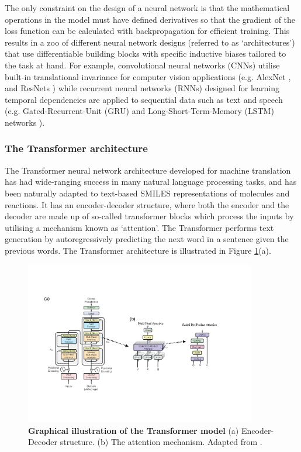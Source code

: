 The only constraint on the design of a neural network is that the mathematical operations in the model must have defined derivatives so that the gradient of the loss function can be calculated with backpropagation for efficient training. This results in a zoo of different neural network designs (referred to as `architectures') that use differentiable building blocks with specific inductive biases tailored to the task at hand. For example, convolutional neural networks (CNNs) utilise built-in translational invariance for computer vision applications (e.g. AlexNet \cite{Krizhevsky2012AlexNet}, and ResNets \cite{He2015ResNet}) while recurrent neural networks (RNNs) designed for learning temporal dependencies are applied to sequential data such as text \cite{Cho2014RNN} and speech \cite{Lipton2015RNN} (e.g. Gated-Recurrent-Unit (GRU) \cite{Chung2014GRU} and Long-Short-Term-Memory (LSTM) networks \cite{Hochreiter1997LSTM}). 

\subsubsection{The Transformer architecture}

The Transformer neural network architecture \cite{Vaswani2017} developed for machine translation has had wide-ranging success in many natural language processing tasks, and has been naturally adapted to text-based SMILES representations of molecules and reactions. It has an encoder-decoder structure, where both the encoder and the decoder are made up of so-called transformer blocks which process the inputs by utilising a mechanism known as `attention'. The Transformer performs text generation by autoregressively predicting the next word in a sentence given the previous words. The Transformer architecture is illustrated in Figure \ref{fig:transformer}(a).

\begin{figure}[ht]
\centering 
\includegraphics[width=0.9\textwidth]{Chapters/Background/Figs/transformer.pdf}
\caption{\textbf{Graphical illustration of the Transformer model} (a) Encoder-Decoder structure. (b) The attention mechanism. Adapted from \cite{Vaswani2017}.}
\label{fig:transformer}
\end{figure}

